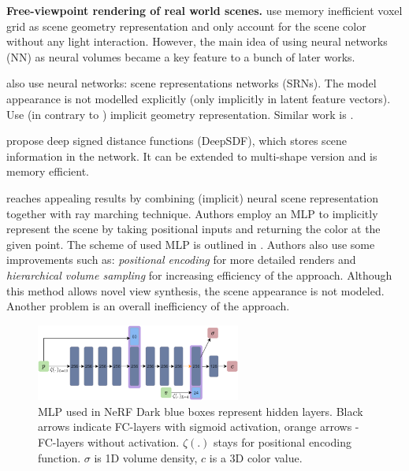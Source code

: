 \documentclass[english]{article}
\newcommand{\rphr}[1]{{\color{blue}#1}}
\begin{document}


\textbf{Free-viewpoint rendering of real world scenes.} \cite{lombardi2019} use memory inefficient voxel grid as scene geometry representation and only account for the scene color without any light interaction. However, the main idea of using neural networks (NN) as neural volumes became a key feature to a bunch of later works.

\cite{sitzmann2019} also use neural networks: scene representations networks (SRNs). The model appearance is not modelled explicitly (only implicitly in latent feature vectors). Use (in contrary to \cite{lombardi2019}) implicit geometry representation. Similar work is \cite{pifu2019}.

\cite{deepsdf2019} propose deep signed distance functions (DeepSDF), which stores scene information in the network. It can be extended to multi-shape version and is memory efficient.

\cite{nerf2020mildenhall} reaches appealing results by combining (implicit) neural scene representation together with ray marching technique. Authors employ an MLP to implicitly represent the scene by taking positional inputs and returning the color at the given point. The scheme of used MLP is outlined in . Authors also use some improvements such as: \textit{positional encoding} for more detailed renders and \textit{hierarchical volume sampling} for increasing efficiency of the approach. Although this method allows novel view synthesis, the scene appearance is not modeled. Another problem is an overall inefficiency of the approach.

\begin{figure}[t]
    \centering
    \includegraphics[width=0.6\textwidth]{img/mlp_nerf.png}
    \caption{MLP used in NeRF \cite{nerf2020mildenhall} Dark blue boxes represent hidden layers. Black arrows indicate FC-layers with sigmoid activation, orange arrows - FC-layers without activation. $\zeta(.)$ stays for positional encoding function. $\sigma$ is 1D volume density, $c$ is a 3D color value. }
    \label{fig:mlp_nerf}
\end{figure}
\end{document}
